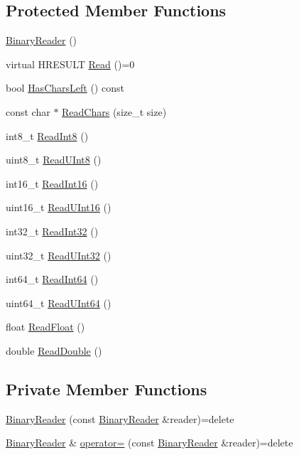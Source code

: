 \subsection*{Protected Member Functions}
\begin{DoxyCompactItemize}
\item 
\hyperlink{classmage_1_1_binary_reader_aab82579cef4f2f022273cf1adfcc8497}{Binary\+Reader} ()
\item 
virtual H\+R\+E\+S\+U\+LT \hyperlink{classmage_1_1_binary_reader_a000cf97b640a5fbd1d5c33ccaae7fb39}{Read} ()=0
\item 
bool \hyperlink{classmage_1_1_binary_reader_a35b10713dca7a416b73b28d5f6aaf600}{Has\+Chars\+Left} () const
\item 
const char $\ast$ \hyperlink{classmage_1_1_binary_reader_af1e0e4ab815e23c72ab65fd7c0748d3f}{Read\+Chars} (size\+\_\+t size)
\item 
int8\+\_\+t \hyperlink{classmage_1_1_binary_reader_abfc9296a42190b21ad0ddb6e0ea119af}{Read\+Int8} ()
\item 
uint8\+\_\+t \hyperlink{classmage_1_1_binary_reader_af0378b53d82b20ec703e09b325d7a5d2}{Read\+U\+Int8} ()
\item 
int16\+\_\+t \hyperlink{classmage_1_1_binary_reader_abb90a96c485b3acb1af3bb3bd88b76c5}{Read\+Int16} ()
\item 
uint16\+\_\+t \hyperlink{classmage_1_1_binary_reader_ad93616adef47e0256f117b8a6f8ba8bb}{Read\+U\+Int16} ()
\item 
int32\+\_\+t \hyperlink{classmage_1_1_binary_reader_a8a463e4e5469e90246a40f2898abbc67}{Read\+Int32} ()
\item 
uint32\+\_\+t \hyperlink{classmage_1_1_binary_reader_a4decb312a91e30406b82178268053f53}{Read\+U\+Int32} ()
\item 
int64\+\_\+t \hyperlink{classmage_1_1_binary_reader_a404b0bdd39f4f1cd52cb8360896ac851}{Read\+Int64} ()
\item 
uint64\+\_\+t \hyperlink{classmage_1_1_binary_reader_a480f2bd7320beed37a71b8122c8550bd}{Read\+U\+Int64} ()
\item 
float \hyperlink{classmage_1_1_binary_reader_af18ab2185b7c766c2183ab54f4676d57}{Read\+Float} ()
\item 
double \hyperlink{classmage_1_1_binary_reader_aa9d54a457a85d6f488d818c0a3e56560}{Read\+Double} ()
\end{DoxyCompactItemize}
\subsection*{Private Member Functions}
\begin{DoxyCompactItemize}
\item 
\hyperlink{classmage_1_1_binary_reader_a8c1ff948f1d056439f3d8cc37d7f507c}{Binary\+Reader} (const \hyperlink{classmage_1_1_binary_reader}{Binary\+Reader} \&reader)=delete
\item 
\hyperlink{classmage_1_1_binary_reader}{Binary\+Reader} \& \hyperlink{classmage_1_1_binary_reader_a0408bb456983b4a03ae42ab69c6f4bc3}{operator=} (const \hyperlink{classmage_1_1_binary_reader}{Binary\+Reader} \&reader)=delete
\end{DoxyCompactItemize}
